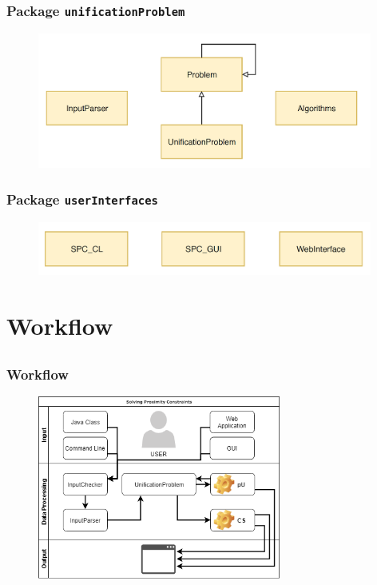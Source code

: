 
	\begin{frame}[fragile=singleslide]
	\frametitle{Package \texttt{unificationProblem}}
	 
	\begin{figure}
		\centering
			\includegraphics[width=11cm]{Bilder/unificationProblem.PNG}
		\label{fig:elements}
	\end{figure}
	
  \end{frame}	
	
	
	\begin{frame}[fragile=singleslide]
	\frametitle{Package \texttt{userInterfaces}}
	 
	\begin{figure}
		\centering
			\includegraphics[width=11cm]{Bilder/userInterfaces.PNG}
		\label{fig:elements}
	\end{figure}
	
  \end{frame}

	\section{Workflow} \subsection{}
	
		\begin{frame}[fragile=singleslide]
		\frametitle{Workflow}
		
		\begin{figure}
			\centering
				\includegraphics[width=8cm]{Bilder/WorkFlow.PNG}
			\label{fig:WorkFlow}
		\end{figure}
		
		\end{frame}

